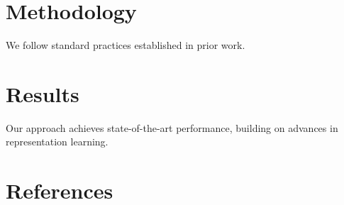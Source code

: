 \documentclass{article}
\begin{document}
\section{Methodology}

We follow standard practices established in prior work.

\section{Results}

Our approach achieves state-of-the-art performance, building on advances in representation learning.

\section{References}
\end{document}
